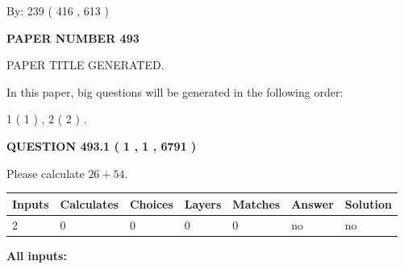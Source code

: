 \documentclass[12pt]{article}
\begin{document}
   
\hspace{1.0in} By: 
 239 ( 416 ,  613 )
   
   
   
   
\newpage 
\setcounter{page}{ 
   493001 } 
   
   
   
   
 {\textbf{ \Large{ PAPER NUMBER  493  }}}
   
   
\vspace{0.2in}
   
   
   
   
   
   
   
   
 \vspace{0.2in}
 
 
 
 
   
   
 PAPER TITLE GENERATED.
   
   
   
\vspace{0.2in}
   
In this paper, big questions will be generated in the following order: 
   
   
   1 ( 1 )
 ,
   2 ( 2 )
 .
  
\vspace{0.2in}
  
{\textbf{\Large{QUESTION
493.1 
 ( 1 , 1 , 6791 )
}}}
  
  
 
Please calculate $ %
26 +  %
54 $.
 
 
   
   
   
   
\noindent\begin{tabular}{|l|l|l|l|l|l|l|}
 \hline
Inputs & Calculates & Choices & Layers & Matches & Answer & Solution \\ \hline
 2  & 
 0  & 
 0
  & 
 0  & 
 0  & 
  no & 
  no 
  \\ \hline
 \end{tabular}
   
   
   
   
\noindent{}
   
   
   
   
\noindent\vspace{0.1in}\hspace{-0.08in} {\textbf{\Large{All inputs: }}}
   
\end{document}
